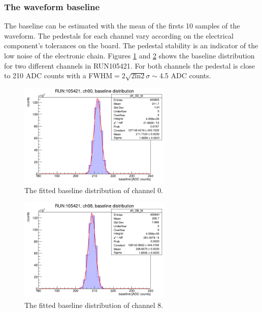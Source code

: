 \subsubsection{The waveform baseline}\label{basel}
The baseline can be estimated with the mean of the firsts 10 samples of the waveform. 
The pedestals for each channel vary according on the electrical component's tolerances on the board.
The pedestal stability is an indicator of the low noise of the electronic chain.
Figures \ref{fig:baseline1} and \ref{fig:baseline2} shows the baseline distribution for two different channels in RUN105421.
For both channels the pedestal is close to 210 ADC counts with a FWHM$=2 \sqrt{2 \text{ln}2}\sigma\sim$4.5 ADC counts.
  \begin{figure}[!h]
      \centering
      \includegraphics[width=0.65\textwidth]{figures/png/baseline_ch00.png}
      \caption{The fitted baseline distribution of channel 0.}
      \label{fig:baseline1}
  \end{figure}
  \begin{figure}[!h]
      \centering
      \includegraphics[width=0.65\textwidth]{figures/png/baseline_ch08.png}
      \caption{The fitted baseline distribution of channel 8.}
      \label{fig:baseline2}
\end{figure}

